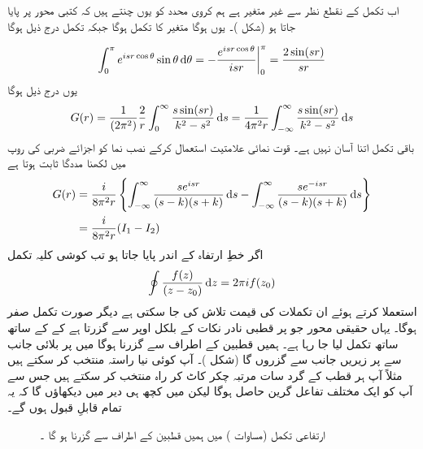 اب  تکمل کے نقطع نظر سے  غیر متغیر ہے ہم کروی محدد  کو یوں چنتے ہیں کہ  کتبی محور پر پایا جاتا ہو  (شکل )۔ یوں  ہوگا متغیر  کا تکمل  ہوگا جبکہ  تکمل درج ذیل ہوگا
 
\begin{align}
	\int_{0}^{\pi}e^{isr\cos\theta}\sin\theta\dif\theta = -\frac{e^{isr\cos\theta}}{isr}\bigg|^\pi_{0} = \frac{2\sin(sr)}{sr}
\end{align}
یوں درج ذیل ہوگا
\begin{align}
	G(r) = \frac{1}{(2\pi^2)}\frac{2}{r}\int_{0}^{\infty}\frac{s \sin(sr)}{k^2-s^2}\dif s = \frac{1}{4\pi^2r}\int_{-\infty}^{\infty}\frac{s \sin(sr)}{k^2-s^2}\dif s
\end{align}
باقی تکمل اتنا آسان نہیں ہے۔ قوت نمائی علامتیت استعمال کرکے نصب نما کو اجزائے ضربی کی روپ میں لکھنا مددگا ثابت ہوتا ہے
\begin{align}\label{مساوات_بکھراو_گرین_دوبارہ}
	G(r) &= \frac{i}{8\pi^2r}\left\{\int_{-\infty}^{\infty}\frac{se^{isr}}{(s-k)(s+k)}\dif s-\int_{-\infty}^{\infty}\frac{se^{-isr}}{(s-k)(s+k)}\dif s\right\}\nonumber \\
	&= \frac{i}{8\pi^2r}(I_1-I_2)
\end{align}
اگر  خطِ ارتفاہ کے اندر پایا جاتا ہو تب کوشی کلیہ تکمل 
\begin{align}
	\oint\frac{f(z)}{(z-z_0)}\dif z = 2\pi if(z_0)
\end{align}
استعملا کرتے ہوئے ان تکملات کی قیمت تلاش کی جا سکتی ہے دیگر صورت تکمل صفر ہوگا۔ یہاں حقیقی محور جو  پر قطبی نادر نکات کے بلکل اوپر سے گزرتا ہے کے کے ساتھ ساتھ تکمل لیا جا رہا ہے۔ ہمیں قطبین کے اطراف سے گزرنا ہوگا میں  پر بلائی جانب سے  پر زیریں جانب سے گزروں گا (شکل )۔ آپ کوئی نیا راستہ منتخب کر سکتے ہیں مثلاً آپ ہر قطب کے گرد سات مرتبہ چکر کاٹ کر راہ منتخب کر سکتے ہیں جس سے آپ کو ایک مختلف تفاعل گرین حاصل ہوگا لیکن میں کچھ ہی دیر میں دیکھاؤں گا کہ یہ تمام قابلِ قبول ہوں گے۔
\begin{figure}
\centering
{}
\caption{ارتفاعی تکمل (مساوات ) میں ہمیں  قطبین کے  اطراف سے گزرنا ہو گا ۔}
\label{شکل_بکھراو_قطبین_اطراف_گزرنا}
\end{figure}
